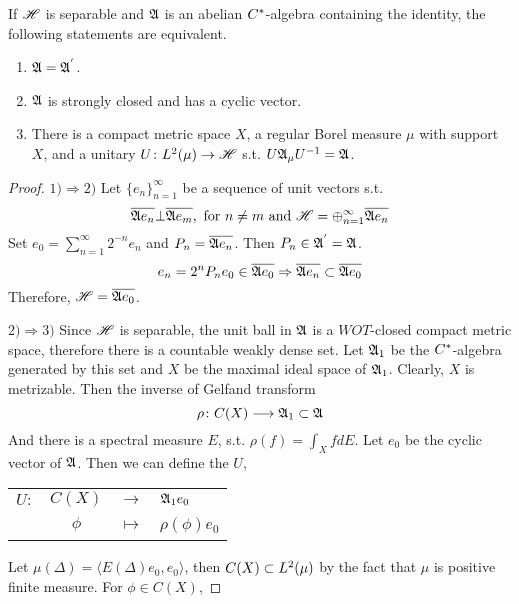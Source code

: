 \documentclass[a4paper,11pt]{report}
\begin{document}
\begin{thm}
	If $\mathscr{H}$ is separable and $\mathfrak{A}$ is an abelian $C^{*}$-algebra containing the identity, the following statements are equivalent.
	\begin{enumerate}[label=\arabic*)]
		\item $\mathfrak{A}=\mathfrak{A}^{'}$.
		\item $\mathfrak{A}$ is strongly closed and has a cyclic vector.
		\item There is a compact metric space $X$, a regular Borel measure $\mu$ with support $X$, and a unitary $U \colon L^{2}(\mu) \rightarrow \mathscr{H}$ s.t. $U\mathfrak{A}_{\mu}U^{-1}=\mathfrak{A}$.
	\end{enumerate}
\end{thm}
\begin{proof}
	$1) \Rightarrow 2)$ Let $\{e_n\}_{n=1}^{\infty}$ be a sequence of unit vectors s.t. 
	\begin{equation*}
		\overline{\mathfrak{A} e_n} \bot \overline{\mathfrak{A} e_m},\text{ for } n \neq m \text{ and } \mathscr{H} = \oplus_{n=1}^{\infty} \overline{\mathfrak{A} e_n}
	\end{equation*}
	Set $e_0 = \sum_{n=1}^{\infty} 2^{-n} e_n$ and $P_n = \overline{\mathfrak{A} e_n}$. Then $P_n \in \mathfrak{A}^{'} = \mathfrak{A}$. 
	\begin{equation*}
		e_n = 2^{n} P_n e_0 \in \overline{\mathfrak{A} e_0} \Rightarrow \overline{\mathfrak{A} e_n} \subset \overline{\mathfrak{A} e_0}
	\end{equation*}
	Therefore, $\mathscr{H} = \overline{\mathfrak{A} e_0}$.
	\item $2) \Rightarrow 3)$ Since $\mathscr{H}$ is separable, the unit ball in $\mathfrak{A}$ is a $WOT$-closed  compact metric space, therefore there is a countable weakly dense set. Let $\mathfrak{A}_1$ be the $C^{*}$-algebra generated by this set and $X$ be the maximal ideal space of $\mathfrak{A}_1$. Clearly, $X$ is metrizable. Then the inverse of Gelfand transform
	\begin{equation*}
		\rho \colon C(X) \longrightarrow \mathfrak{A}_1 \subset \mathfrak{A}
	\end{equation*}
	And there is a spectral measure $E$, s.t. $\rho(f) = \int_{X} f dE$.
	Let $e_0$ be the cyclic vector of $\mathfrak{A}$. Then we can define the $U$,
	\begin{center}
		\begin{tabular}{l c c l}
			$U \colon$ & $C(X)$ & $\longrightarrow$ & $\mathfrak{A}_1 e_0$ \\
			~ & $\phi$ & $\longmapsto$ & $\rho(\phi)e_0$
		\end{tabular}
	\end{center}
	Let $\mu(\Delta) = \langle E(\Delta)e_0,e_0 \rangle$, then $C(X) \subset L^{2}(\mu)$ by the fact that $\mu$ is positive finite measure. For $\phi \in C(X)$,

\end{proof}
\end{document}
